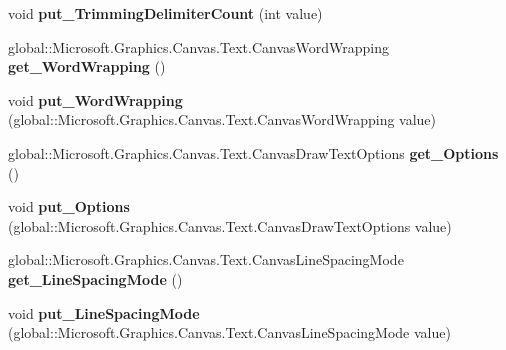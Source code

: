 \begin{DoxyCompactItemize}
void {\bfseries put\+\_\+\+Trimming\+Delimiter\+Count} (int value)
\item 
\mbox{\label{interface_microsoft_1_1_graphics_1_1_canvas_1_1_text_1_1_i_canvas_text_layout_afbb8fcd40e47ef1832d9fd70aafbc3c6}} 
global\+::\+Microsoft.\+Graphics.\+Canvas.\+Text.\+Canvas\+Word\+Wrapping {\bfseries get\+\_\+\+Word\+Wrapping} ()
\item 
\mbox{\label{interface_microsoft_1_1_graphics_1_1_canvas_1_1_text_1_1_i_canvas_text_layout_a9fd193e537a381cd8b74d7a6788b09b8}} 
void {\bfseries put\+\_\+\+Word\+Wrapping} (global\+::\+Microsoft.\+Graphics.\+Canvas.\+Text.\+Canvas\+Word\+Wrapping value)
\item 
\mbox{\label{interface_microsoft_1_1_graphics_1_1_canvas_1_1_text_1_1_i_canvas_text_layout_abcd9c95c3e186e366b308e9268aec7b3}} 
global\+::\+Microsoft.\+Graphics.\+Canvas.\+Text.\+Canvas\+Draw\+Text\+Options {\bfseries get\+\_\+\+Options} ()
\item 
\mbox{\label{interface_microsoft_1_1_graphics_1_1_canvas_1_1_text_1_1_i_canvas_text_layout_a2d49e25d90aae82a410bddfc947d5a20}} 
void {\bfseries put\+\_\+\+Options} (global\+::\+Microsoft.\+Graphics.\+Canvas.\+Text.\+Canvas\+Draw\+Text\+Options value)
\item 
\mbox{\label{interface_microsoft_1_1_graphics_1_1_canvas_1_1_text_1_1_i_canvas_text_layout_adf0a5326f22b270c50010a147728dbf0}} 
global\+::\+Microsoft.\+Graphics.\+Canvas.\+Text.\+Canvas\+Line\+Spacing\+Mode {\bfseries get\+\_\+\+Line\+Spacing\+Mode} ()
\item 
\mbox{\label{interface_microsoft_1_1_graphics_1_1_canvas_1_1_text_1_1_i_canvas_text_layout_a36fefc4917fac46be5776c84bed1b9de}} 
void {\bfseries put\+\_\+\+Line\+Spacing\+Mode} (global\+::\+Microsoft.\+Graphics.\+Canvas.\+Text.\+Canvas\+Line\+Spacing\+Mode value)

\end{DoxyCompactItemize}
